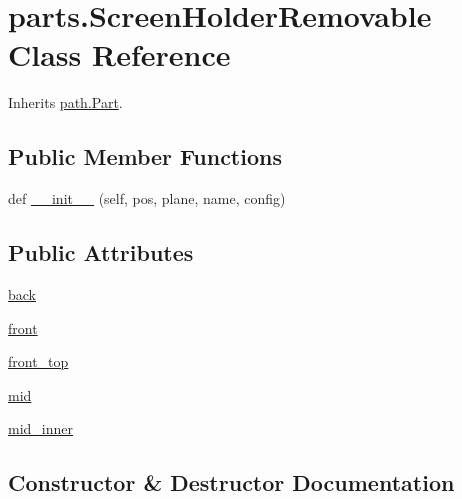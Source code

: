 \hypertarget{classparts_1_1_screen_holder_removable}{}\section{parts.\+Screen\+Holder\+Removable Class Reference}
\label{classparts_1_1_screen_holder_removable}


Inherits \hyperlink{classpath_1_1_part}{path.\+Part}.

\subsection*{Public Member Functions}
\begin{DoxyCompactItemize}
\item 
def \hyperlink{classparts_1_1_screen_holder_removable_a34094a846f352a3e3f6878cae03ab647}{\+\_\+\+\_\+init\+\_\+\+\_\+} (self, pos, plane, name, config)
\end{DoxyCompactItemize}
\subsection*{Public Attributes}
\begin{DoxyCompactItemize}
\item 
\hyperlink{classparts_1_1_screen_holder_removable_a93d9e972d917237b632b3e1486a26753}{back}
\item 
\hyperlink{classparts_1_1_screen_holder_removable_ab9353d8a8f50a4befec54255b14e3701}{front}
\item 
\hyperlink{classparts_1_1_screen_holder_removable_ad35d5ab861b1c9235ce85f9983df2fe5}{front\+\_\+top}
\item 
\hyperlink{classparts_1_1_screen_holder_removable_af1e5f3e16411c642f41ea631f697a425}{mid}
\item 
\hyperlink{classparts_1_1_screen_holder_removable_abda61ab8d911e57fc44cab7154c18f34}{mid\+\_\+inner}
\end{DoxyCompactItemize}


\subsection{Constructor \& Destructor Documentation}
\hypertarget{classparts_1_1_screen_holder_removable_a34094a846f352a3e3f6878cae03ab647}{}

